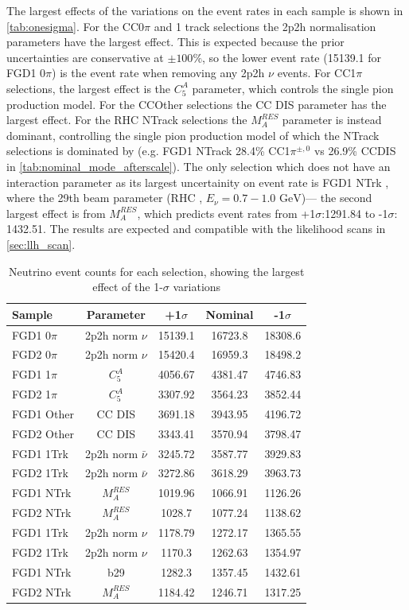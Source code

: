 The largest effects of the variations on the event rates in each sample is shown in \autoref{tab:onesigma}. For the CC0$\pi$ and 1 track selections the 2p2h normalisation parameters have the largest effect. This is expected because the prior uncertainties are conservative at $\pm100\%$, so the lower event rate (15139.1 for FGD1 0$\pi$) is the event rate when removing any 2p2h $\nu$ events. For CC1$\pi$ selections, the largest effect is the $C_5^A$ parameter, which controls the single pion production model. For the CCOther selections the CC DIS parameter has the largest effect. For the RHC NTrack selections the $M_A^{RES}$ parameter is instead dominant, controlling the single pion production model of which the NTrack selections is dominated by (e.g. FGD1 NTrack 28.4\% CC1$\pi^{\pm,0}$ vs 26.9\% CCDIS in \autoref{tab:nominal_mode_afterscale}). The only selection which does not have an interaction parameter as its largest uncertainity on event rate is FGD1 NTrk \numu, where the 29th beam parameter (RHC \numubar, $E_\nu = 0.7-1.0 \text{ GeV}$)--- the second largest effect is from $M_A^{RES}$, which predicts event rates from +1$\sigma$:1291.84 to -1$\sigma$: 1432.51. The results are expected and compatible with the likelihood scans in \autoref{sec:llh_scan}.
\begin{table}[h]
	\centering
	\begin{tabular}{l | c | c c c }
		\hline
		\hline
		Sample & Parameter & +1$\sigma$ & Nominal & -1$\sigma$ \\
		\hline
		FGD1 0$\pi$ & 2p2h norm $\nu$ & 15139.1 & 16723.8 & 18308.6 \\
		FGD2 0$\pi$ & 2p2h norm $\nu$ & 15420.4 & 16959.3 & 18498.2 \\
		FGD1 1$\pi$ & $C^A_5$ & 4056.67 & 4381.47 & 4746.83 \\
		FGD2 1$\pi$ & $C^A_5$ & 3307.92 & 3564.23 & 3852.44 \\
		FGD1 Other & CC DIS & 3691.18 & 3943.95 & 4196.72 \\
		FGD2 Other & CC DIS & 3343.41 & 3570.94 & 3798.47 \\
		\hline
		FGD1 1Trk & 2p2h norm $\bar{\nu}$ & 3245.72 & 3587.77 & 3929.83 \\ 
		FGD2 1Trk & 2p2h norm $\bar{\nu}$ & 3272.86 & 3618.29 & 3963.73 \\
		FGD1 NTrk & $M_A^{RES}$ & 1019.96 & 1066.91 & 1126.26 \\
		FGD2 NTrk & $M_A^{RES}$ & 1028.7 & 1077.24 & 1138.62 \\
		
		\hline
		FGD1 1Trk \numu & 2p2h norm $\nu$ & 1178.79 & 1272.17 & 1365.55 \\
		FGD2 1Trk \numu & 2p2h norm $\nu$ & 1170.3 & 1262.63 & 1354.97 \\
		FGD1 NTrk \numu & b29 & 1282.3 & 1357.45 & 1432.61 \\
		FGD2 NTrk \numu & $M_A^{RES}$ & 1184.42 & 1246.71 & 1317.25 \\
		\hline
		\hline
	\end{tabular}
	\caption{Neutrino event counts for each selection, showing the largest effect of the 1-$\sigma$ variations}
	\label{tab:onesigma}
\end{table}

